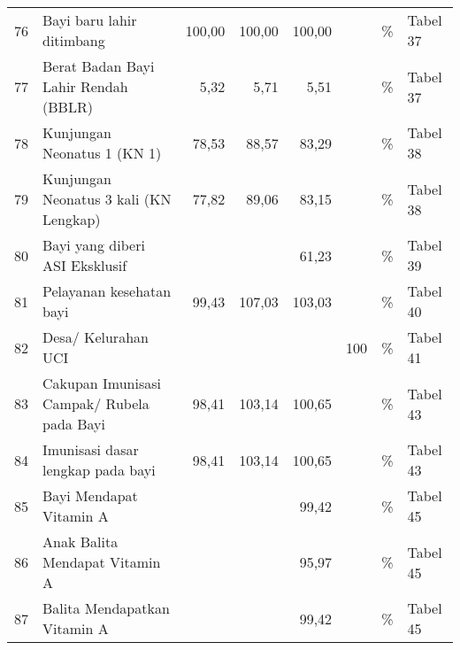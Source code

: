 \begin{small}
\begin{longtable}{rY{12em}rrrrY{5em}Y{5em}}
	 76 & Bayi baru lahir ditimbang                                                   & 100,00 & 100,00 &             100,00 &          & \%                             & Tabel 37 \\
	 77 & Berat Badan Bayi Lahir Rendah (BBLR)                                        &   5,32 &   5,71 &               5,51 &          & \%                             & Tabel 37 \\
	 78 & Kunjungan Neonatus 1 (KN 1)                                                 &  78,53 &  88,57 &              83,29 &          & \%                             & Tabel 38 \\
	 79 & Kunjungan Neonatus 3 kali (KN Lengkap)                                      &  77,82 &  89,06 &              83,15 &          & \%                             & Tabel 38 \\
	 80 & Bayi yang diberi ASI Eksklusif                                              &        &        &              61,23 &          & \%                             & Tabel 39 \\
	 81 & Pelayanan kesehatan bayi                                                    &  99,43 & 107,03 &             103,03 &          & \%                             & Tabel 40 \\
	 82 & Desa/ Kelurahan UCI                                                         &        &        &                    &      100 & \%                             & Tabel 41 \\
	 83 & Cakupan Imunisasi Campak/ Rubela pada Bayi                                  &  98,41 & 103,14 &             100,65 &          & \%                             & Tabel 43 \\
	 84 & Imunisasi dasar lengkap pada bayi                                           &  98,41 & 103,14 &             100,65 &          & \%                             & Tabel 43 \\
	 85 & Bayi Mendapat Vitamin A                                                     &        &        &              99,42 &          & \%                             & Tabel 45 \\
	 86 & Anak Balita Mendapat Vitamin A                                              &        &        &              95,97 &          & \%                             & Tabel 45 \\
	 87 & Balita Mendapatkan Vitamin A                                                &        &        &              99,42 &          & \%                             & Tabel 45 \\

\end{longtable}
\end{small}
